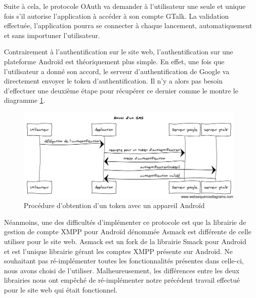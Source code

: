 Suite à cela, le protocole OAuth va demander à l'utilisateur une seule et unique fois s'il autorise 
l'application à accéder à son compte GTalk. La validation effectuée, l'application pourra se connecter 
à chaque lancement, automatiquement et sans importuner l'utilisateur. 


Contrairement à l'authentification sur le site web, l'authentification sur une plateforme Androïd est
théoriquement plus simple. En effet, une fois que l'utilisateur a donné son accord, le serveur 
d'authentification de Google va directement envoyer le token d'authentification. Il n'y a alors pas 
besoin d'effectuer une deuxième étape pour récupérer ce dernier comme le montre le diagramme 
\ref{obtention-token-avec-android}.
 
 
 
\begin{figure}[!h]
  \center
  \includegraphics[width=15cm]{img/obtention-token-avec-android.png}
  \caption{Procédure d'obtention d'un token avec un appareil Androïd}
  \label{obtention-token-avec-android}
\end{figure}

Néanmoins, une des difficultés d'implémenter ce protocole est que la librairie de gestion de compte
XMPP pour Androïd dénommée Asmack est différente de celle utiliser pour le site web. Asmack est un fork 
de la librairie Smack pour Androïd et est l'unique librairie gérant les comptes XMPP présente sur
Androïd. Ne souhaitant pas ré-implémenter toutes les fonctionnalités présentes dans celle-ci, nous avons
choisi de l'utiliser. Malheureusement, les différences entre les deux librairies nous ont empêché de 
ré-implémenter notre précédent travail effectué pour le site web qui était fonctionnel. 

